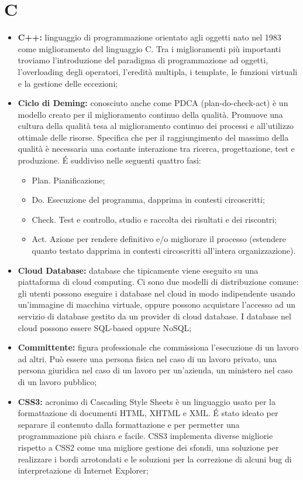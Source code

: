 \section*{C} %
\label{sec:c}
	\begin{itemize}
		\item \textbf{C++:} linguaggio di programmazione orientato agli oggetti nato nel 1983 come miglioramento del linguaggio C. Tra i miglioramenti più importanti troviamo l'introduzione del paradigma di programmazione ad oggetti, l'overloading degli operatori, l'eredità multipla, i template, le funzioni virtuali e la gestione delle eccezioni;
		\item \textbf{Ciclo di Deming:} conosciuto anche come PDCA (plan-do-check-act) è un modello creato per il miglioramento continuo della qualità. Promuove una cultura della qualità tesa al miglioramento continuo dei processi e all'utilizzo ottimale delle risorse. Specifica che per il raggiungimento del massimo della qualità è necessaria una costante interazione tra ricerca, progettazione, test e produzione. É suddiviso nelle seguenti quattro fasi:
			\begin{itemize}
				\item Plan. Pianificazione;
				\item Do. Esecuzione del programma, dapprima in contesti circoscritti;
				\item Check. Test e controllo, studio e raccolta dei risultati e dei riscontri;
				\item Act. Azione per rendere definitivo e/o migliorare il processo (estendere quanto testato dapprima in contesti circoscritti all'intera organizzazione).
			\end{itemize}
		\item \textbf{Cloud Database:} database che tipicamente viene eseguito su una piattaforma di cloud computing. Ci sono due modelli di distribuzione comune: gli utenti possono eseguire i database nel cloud in modo indipendente usando un'immagine di macchina virtuale, oppure possono acquistare l'accesso ad un servizio di database gestito da un provider di cloud database. I database nel cloud possono essere SQL-based oppure NoSQL;
		\item \textbf{Committente:} figura professionale che commissiona l'esecuzione di un lavoro ad altri. Può essere una persona fisica nel caso di un lavoro privato, una persona giuridica nel caso di un lavoro per un'azienda, un ministero nel caso di un lavoro pubblico;
		\item \textbf{CSS3:} acronimo di Cascading Style Sheets è un linguaggio usato per la formattazione di documenti HTML, XHTML e XML. É stato ideato per separare il contenuto dalla formattazione e per permetter una programmazione più chiara e facile. CSS3 implementa diverse migliorie rispetto a CSS2 come una migliore gestione dei sfondi, una soluzione per realizzare i bordi arrotondati e le soluzioni per la correzione di alcuni bug di interpretazione di Internet Explorer;
	\end{itemize}
\pagebreak


